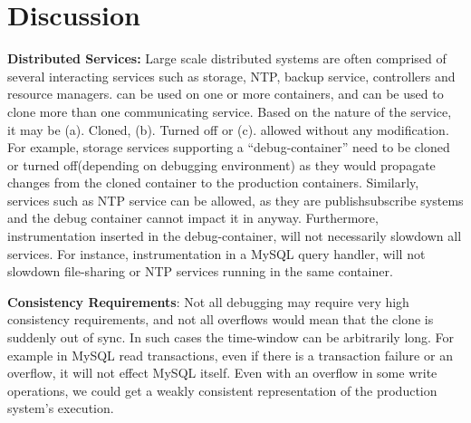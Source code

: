 \fi
\section{Discussion}
\label{sec:discussion}

\textbf{Distributed Services:}  
Large scale distributed systems are often comprised of several interacting services such as storage, NTP, backup service, controllers and resource managers.
\parikshan can be used on one or more containers, and can be used to clone more than one communicating service.
Based on the nature of the service, it may be (a). Cloned, (b). Turned off or (c). allowed without any modification.
For example, storage services supporting a ``debug-container'' need to be cloned or turned off(depending on debugging environment) as they would propagate changes from the cloned container to the production containers.
Similarly, services such as NTP service can be allowed, as they are publish\/subscribe systems and the debug container cannot impact it in anyway.
Furthermore, instrumentation inserted in the debug-container, will not necessarily slowdown all services.
For instance, instrumentation in a MySQL query handler, will not slowdown file-sharing or NTP services running in the same container.

\textbf{Consistency Requirements}: Not all debugging may require very high consistency requirements, and not all overflows would mean that the clone is suddenly out of sync.
In such cases the time-window can be arbitrarily long. 
For example in MySQL read transactions, even if there is a transaction failure or an overflow, it will not effect MySQL itself.
Even with an overflow in some write operations, we could get a weakly consistent representation of the production system's execution.


